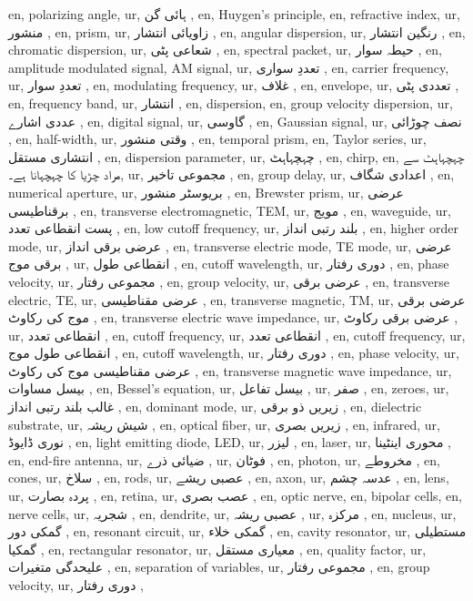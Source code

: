en, polarizing angle,
ur, ہائی گن ,
en, Huygen's principle,
en, refractive index,
ur, منشور ,
en, prism,
ur, زاویائی انتشار ,
en, angular dispersion,
ur, رنگین انتشار ,
en, chromatic dispersion,
ur, شعاعی پٹی ,
en, spectral packet,
ur, حیطہ سوار ,
en, amplitude modulated signal, AM signal,
ur, تعددِ سواری ,
en, carrier frequency,
ur, تعددِ سوار ,
en, modulating frequency,
ur, غلاف ,
en, envelope,
ur, تعددی پٹی ,
en, frequency band,
ur, انتشار ,
en, dispersion,
en, group velocity dispersion,
ur, عددی اشارے ,
en, digital signal,
ur, گاوسی ,
en, Gaussian signal,
ur, نصف چوڑائی ,
en, half-width,
ur, وقتی منشور ,
en, temporal prism,
en, Taylor series,
ur, انتشاری مستقل ,
en, dispersion parameter,
ur, چہچہاہٹ ,
en, chirp,
en, چہچہاہٹ سے مراد چڑیا کا چہچہانا ہے۔,
ur, مجموعی تاخیر ,
en, group delay,
ur, اعدادی شگاف ,
en, numerical aperture,
ur, بریوسٹر منشور ,
en, Brewster prism,
ur, عرضی برقناطیسی ,
en, transverse electromagnetic, TEM,
ur, مویج ,
en, waveguide,
ur, پست انقطاعی تعدد ,
en, low cutoff frequency,
ur, بلند رتبی انداز ,
en, higher order mode,
ur, عرضی برقی انداز ,
en, transverse electric mode, TE mode,
ur, عرضی برقی موج ,
ur, انقطاعی طول ,
en, cutoff wavelength,
ur, دوری رفتار ,
en, phase velocity,
ur, مجموعی رفتار ,
en, group velocity,
ur, عرضی برقی ,
en, transverse electric, TE,
ur, عرضی مقناطیسی ,
en, transverse magnetic, TM,
ur, عرضی برقی موج کی رکاوٹ ,
en, transverse electric wave impedance,
ur, عرضی برقی رکاوٹ ,
ur, انقطاعی تعدد ,
en, cutoff frequency,
ur, انقطاعی تعدد ,
en, cutoff frequency,
ur, انقطاعی طول موج ,
en, cutoff wavelength,
ur, دوری رفتار ,
en, phase velocity,
ur, عرضی مقناطیسی موج کی رکاوٹ ,
en, transverse magnetic wave impedance,
ur, بیسل مساوات ,
en, Bessel's equation,
ur, بیسل تفاعل ,
ur, صفر ,
en, zeroes,
ur, غالب بلند رتبی انداز ,
en, dominant mode,
ur, زیریں ذو برقی ,
en, dielectric substrate,
ur, شیش ریشہ ,
en, optical fiber,
ur, زیریں بصری ,
en, infrared,
ur, نوری ڈایوڈ ,
en, light emitting diode, LED,
ur, لیزر ,
en, laser,
ur, محوری اینٹینا ,
en, end-fire antenna,
ur, ضیائی ذرے ,
ur, فوٹان ,
en, photon,
ur, مخروطے ,
en, cones,
ur, سلاخ ,
en, rods,
ur, عصبی ریشے ,
en, axon,
ur, عدسہ چشم ,
en, lens,
ur, پردہ بصارت ,
en, retina,
ur, عصب بصری ,
en, optic nerve,
en, bipolar cells,
en, nerve cells,
ur, شجریہ ,
en, dendrite,
ur, عصبی ریشہ ,
ur, مرکزہ ,
en, nucleus,
ur, گمکی دور ,
en, resonant circuit,
ur, گمکی خلاء ,
en, cavity resonator,
ur, مستطیلی گمکیا ,
en, rectangular resonator,
ur, معیاری مستقل ,
en, quality factor,
ur, علیحدگی متغیرات ,
en, separation of variables,
ur, مجموعی رفتار ,
en, group velocity,
ur, دوری رفتار ,
